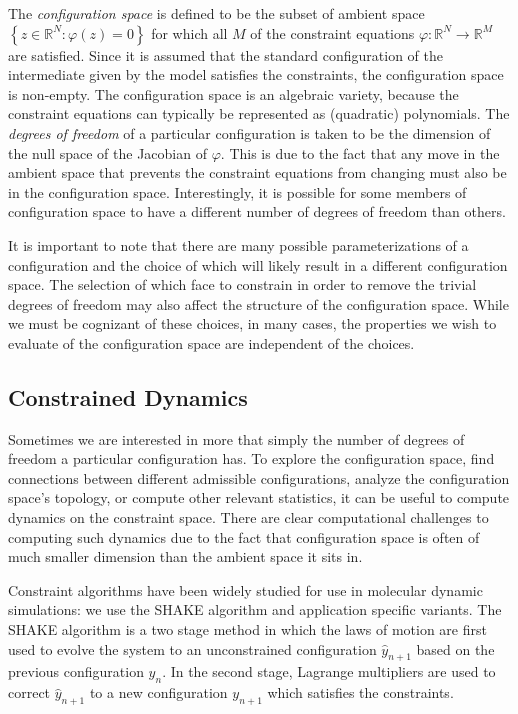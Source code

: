 \documentclass[12pt]{article}
\begin{document}
The \textit{configuration space} is defined to be the subset of ambient space $\left\{z \in \mathbb{R}^N : \varphi\left(z\right) = 0\right\}$  for which all $M$ of the constraint equations $\varphi: \mathbb{R}^N \to  \mathbb{R}^M $ are satisfied.  Since it is assumed that the standard configuration of the intermediate given by the model satisfies the constraints, the configuration space is non-empty. The configuration space is an algebraic variety, because the constraint equations can typically be represented as (quadratic) polynomials.  The \textit{degrees of freedom} of a particular configuration is taken to be the dimension of the null space of the Jacobian of $\varphi$. This is due to the fact that any move in the ambient space that prevents the constraint equations from changing must also be in the configuration space. Interestingly, it is possible for some members of configuration space to have a different number of degrees of freedom than others. 
 
It is important to note that there are many possible parameterizations of a configuration and the choice of which will likely result in a different configuration space. The selection of which face to constrain in order to remove the trivial degrees of freedom may also affect the structure of the configuration space. While we must be cognizant of these choices, in many cases, the properties we wish to evaluate of the configuration space are independent of the choices.

%
%
\subsection{Constrained Dynamics}

Sometimes we are interested in more that simply the number of degrees of freedom a particular configuration has. To explore the configuration space, find connections between different admissible configurations, analyze the configuration space's topology, or compute other relevant statistics, it can be useful to compute dynamics on the constraint space. There are clear computational challenges to computing such dynamics due to the fact that configuration space is often of much smaller dimension than the ambient space it sits in. 

Constraint algorithms have been widely studied for use in molecular dynamic simulations: we use the SHAKE algorithm and application specific variants. The SHAKE algorithm is a two stage method in which the laws of motion are first used to evolve the system to an unconstrained configuration $\hat{y}_{n+1}$ based on the previous configuration $y_n$. In the second stage, Lagrange multipliers are used to correct $\hat{y}_{n+1}$ to a new configuration $y_{n+1}$ which satisfies the constraints. 
\end{document}
